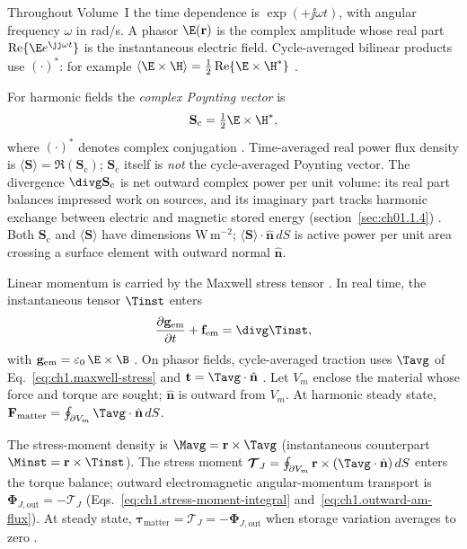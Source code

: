 Throughout Volume~I the time dependence is $\exp(+\jj\omega t)$, with angular frequency
$\omega$ in rad/s. A phasor $\E(\mathbf{r})$ is the complex amplitude whose real part
$\Re\{\E e^{\jj\omega t}\}$ is the instantaneous electric field. Cycle-averaged bilinear products use $(\cdot)^*$: for example $\langle\E\times\H\rangle=\tfrac12\Re\{\E\times\H^*\}$
\cite{stratton1941,harrington2001}.

For harmonic fields the \emph{complex Poynting vector} is
\begin{equation}
\label{eq:ch1.intro-poynting}
\mathbf{S}_\mathrm{c}=\tfrac{1}{2}\E\times\H^*,
\end{equation}
where $(\cdot)^*$ denotes complex conjugation \cite{poynting1884,stratton1941}.
Time-averaged real power flux density is $\langle\mathbf{S}\rangle=\Re(\mathbf{S}_\mathrm{c})$;
$\mathbf{S}_\mathrm{c}$ itself is \emph{not} the cycle-averaged Poynting vector.
The divergence $\divg\mathbf{S}_\mathrm{c}$ is net outward complex power per unit volume:
its real part balances impressed work on sources, and its imaginary part tracks harmonic
exchange between electric and magnetic stored energy (section~\ref{sec:ch01.1.4})
\cite{stratton1941}. Both $\mathbf{S}_\mathrm{c}$ and $\langle\mathbf{S}\rangle$ have
dimensions W\,m$^{-2}$; $\langle\mathbf{S}\rangle\cdot\hat{\mathbf{n}}\,dS$ is active
power per unit area crossing a surface element with outward normal $\hat{\mathbf{n}}$.

Linear momentum is carried by the Maxwell stress tensor \cite{maxwell1873,stratton1941}. In real time, the instantaneous tensor $\Tinst$ enters
\begin{equation}
\label{eq:ch1.intro-momentum-balance}
\frac{\partial\mathbf{g}_{\mathrm{em}}}{\partial t}+\mathbf{f}_{\mathrm{em}}
=\divg\Tinst,
\end{equation}
with $\mathbf{g}_{\mathrm{em}}=\varepsilon_0\,\E\times\B$ \cite{maxwell1873}. On phasor fields, cycle-averaged traction uses $\Tavg$ of Eq.~\eqref{eq:ch1.maxwell-stress} and $\mathbf{t}=\Tavg\cdot\hat{\mathbf{n}}$ \cite{stratton1941}. Let $V_m$ enclose the material whose force and torque are sought; $\hat{\mathbf{n}}$ is outward from $V_m$. At harmonic steady state, $\mathbf{F}_{\mathrm{matter}}=\oint_{\partial V_m}\Tavg\cdot\hat{\mathbf{n}}\,dS$.

The stress-moment density is $\Mavg=\mathbf{r}\times\Tavg$ (instantaneous counterpart $\Minst=\mathbf{r}\times\Tinst$). The stress moment $\boldsymbol{\mathcal{T}}_J=\oint_{\partial V_m}\mathbf{r}\times(\Tavg\cdot\hat{\mathbf{n}})\,dS$ enters the torque balance; outward electromagnetic angular-momentum transport is $\boldsymbol{\Phi}_{J,\mathrm{out}}=-\boldsymbol{\mathcal{T}}_J$ (Eqs.~\eqref{eq:ch1.stress-moment-integral} and~\eqref{eq:ch1.outward-am-flux}). At steady state, $\boldsymbol{\tau}_{\mathrm{matter}}=\boldsymbol{\mathcal{T}}_J=-\boldsymbol{\Phi}_{J,\mathrm{out}}$ when storage variation averages to zero \cite{beth1936,stratton1941}.

